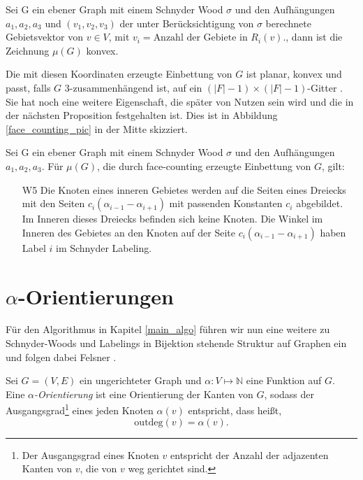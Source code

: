\begin{theorem}
Sei G ein ebener Graph mit einem Schnyder Wood $\sigma$ und den Aufhängungen $a_1,a_2,a_3$ und $(v_1,v_2,v_3)$ der unter Berücksichtigung von $\sigma$ berechnete Gebietsvektor von $v \in V$, mit $ v_i = \text{Anzahl der Gebiete in }R_i(v).$, dann ist die Zeichnung $\mu(G)$ konvex.
\end{theorem}

Die mit diesen Koordinaten erzeugte Einbettung von $G$ ist planar, konvex und passt, falls $G$ 3-zusammenhängend ist, auf ein $(|F|-1)\times(|F|-1)$-Gitter \cite[Korollar 2.8]{felsner12}. Sie hat noch eine weitere Eigenschaft, die später von Nutzen sein wird und die in der nächsten Proposition festgehalten ist.  Dies ist in Abbildung \ref{face_counting_pic} in der Mitte skizziert.

\begin{proposition}\label{w5}
Sei G ein ebener Graph mit einem Schnyder Wood $\sigma$ und den Aufhängungen $a_1,a_2,a_3$. Für $\mu(G)$, die durch face-counting erzeugte Einbettung von $G$, gilt:
\begin{itemize}
\item [W5] Die Knoten eines inneren Gebietes werden auf die Seiten eines Dreiecks mit den Seiten $c_i(\alpha_{i-1}-\alpha_{i+1})$ mit passenden Konstanten $c_i$ abgebildet. Im Inneren dieses Dreiecks befinden sich keine Knoten. Die Winkel im Inneren des Gebietes an den Knoten auf der Seite $c_i(\alpha_{i-1}-\alpha_{i+1})$ haben Label $i$ im Schnyder Labeling.
\end{itemize}
\end{proposition}

\section{$\alpha$-Orientierungen}\label{alpha_orientations}

Für den Algorithmus in Kapitel \ref{main_algo} führen wir nun eine weitere zu Schnyder-Woods und Labelings in Bijektion stehende Struktur auf Graphen ein und folgen dabei Felsner \cite{felsner04}.

\begin{definition}
Sei $G=(V,E)$ ein ungerichteter Graph und $\alpha:V\mapsto\mathbb{N}$ eine Funktion auf $G$. Eine $\alpha$\textit{-Orientierung} ist eine Orientierung der Kanten von $G$, sodass der Ausgangsgrad\footnote{Der Ausgangsgrad eines Knoten $v$ entspricht der Anzahl der adjazenten Kanten von $v$, die von $v$ weg gerichtet sind.} eines jeden Knoten $\alpha(v)$ entspricht, dass heißt, $$\text{outdeg}(v) = \alpha(v).$$
\end{definition}

